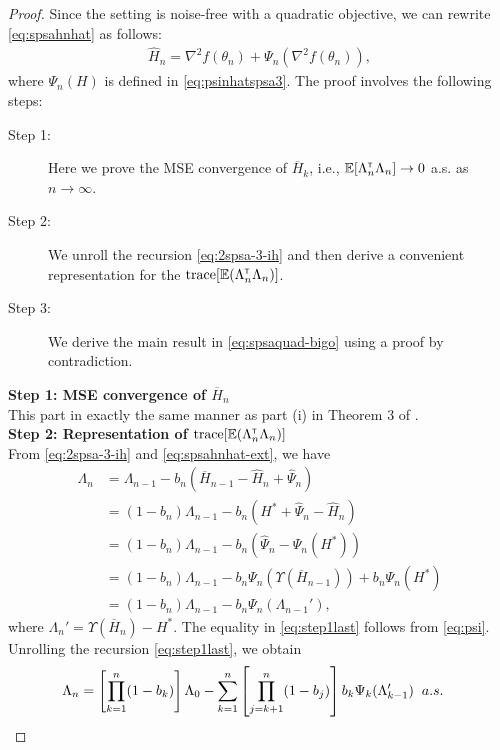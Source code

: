 \begin{proof}
Since the setting is noise-free with a quadratic objective, we can rewrite \eqref{eq:spsahnhat} as follows:
\begin{align}
 \widehat H_n =    \nabla^2 f(\theta_n) +\Psi_{n}(\nabla^2 f(\theta_n)),\label{eq:spsahnhat-ext}
\end{align}
where $\Psi_n(H)$ is defined in \eqref{eq:psinhatspsa3}.
The proof involves the following steps:
\begin{description}
  \item[Step 1:] Here we prove the MSE convergence of $\overline H_k$, i.e., $\mathbb{E} [\Lambda_n^\mathsf{\scriptscriptstyle T} \Lambda_n] \rightarrow 0$ a.s. as $n\rightarrow \infty$.
  \item[Step 2:] We unroll the recursion \eqref{eq:2spsa-3-ih} and then derive a convenient representation for the  $\text{trace}[\mathbb{E} (\Lambda_n ^\mathsf{\scriptscriptstyle T} \Lambda_n)]$.
  \item[Step 3:] We derive the main result in \eqref{eq:spsaquad-bigo} using a proof by contradiction. 
\end{description}
\noindent\textbf{Step 1: MSE convergence of $\overline H_n$} \\
This part in exactly the same manner as part (i) in Theorem 3 of \cite{spall-jacobian}.\\
\noindent\textbf{Step 2: Representation of $\text{trace}[\mathbb{E} (\Lambda_n ^\mathsf{\scriptscriptstyle T} \Lambda_n)]$} \\
 From \eqref{eq:2spsa-3-ih} and \eqref{eq:spsahnhat-ext},  we have
 \begin{align}
 \Lambda_n &= \Lambda_{n-1} - b_n ( \overline H_{n-1} - \hat H_n + \hat \Psi_n) \nonumber\\
&= (1-b_n) \Lambda_{n-1} - b_n (H^* + \hat \Psi_n - \hat H_n ) \nonumber\\&= (1-b_n) \Lambda_{n-1} - b_n (\hat \Psi_n - \Psi_n(H^*)) \nonumber\\&= (1-b_n) \Lambda_{n-1} - b_n \Psi_n(\Upsilon(\overline H_{n-1})) + b_n \Psi_n(H^*) \nonumber\\
&= (1-b_n) \Lambda_{n-1} - b_n\Psi_n(\Lambda_{n-1}'),\label{eq:step1last}
 \end{align}
where $\Lambda_n' = \Upsilon(\overline H_n) - H^*$.
The equality in \eqref{eq:step1last} follows from \eqref{eq:psi}. 
Unrolling the recursion \eqref{eq:step1last}, we obtain 
 \begin{align}\label{lambda-exp}
  \Lambda_n  = \left[ \prod_{k=1}^n (1-b_k) \right]\Lambda_0 
&- \sum_{k=1}^n \left[\prod_{j=k+1}^n (1-b_j)\right] b_k \Psi_k(\Lambda_{k-1}')  \hspace{0.2cm} a.s.

\end{align}
\end{proof}
